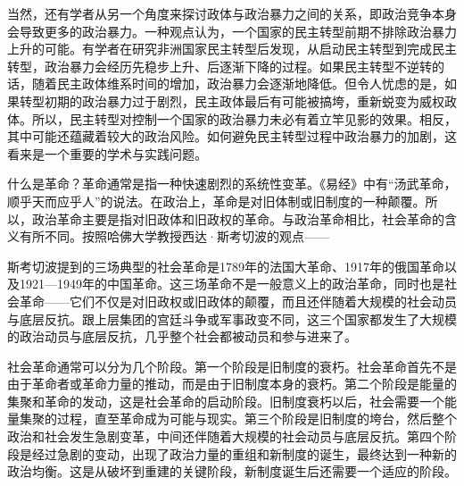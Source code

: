 当然，还有学者从另一个角度来探讨政体与政治暴力之间的关系，即政治竞争本身会导致更多的政治暴力。一种观点认为，一个国家的民主转型前期不排除政治暴力上升的可能。有学者在研究非洲国家民主转型后发现，从启动民主转型到完成民主转型，政治暴力会经历先稳步上升、后逐渐下降的过程。如果民主转型不逆转的话，随着民主政体维系时间的增加，政治暴力会逐渐地降低。但令人忧虑的是，如果转型初期的政治暴力过于剧烈，民主政体最后有可能被搞垮，重新蜕变为威权政体。所以，民主转型对控制一个国家的政治暴力未必有着立竿见影的效果。相反，其中可能还蕴藏着较大的政治风险。如何避免民主转型过程中政治暴力的加剧，这看来是一个重要的学术与实践问题。


什么是革命？革命通常是指一种快速剧烈的系统性变革。《易经》中有“汤武革命，顺乎天而应乎人”的说法。在政治上，革命是对旧体制或旧制度的一种颠覆。所以，政治革命主要是指对旧政体和旧政权的革命。与政治革命相比，社会革命的含义有所不同。按照哈佛大学教授西达·斯考切波的观点——


斯考切波提到的三场典型的社会革命是1789年的法国大革命、1917年的俄国革命以及1921—1949年的中国革命。这三场革命不是一般意义上的政治革命，同时也是社会革命——它们不仅是对旧政权或旧政体的颠覆，而且还伴随着大规模的社会动员与底层反抗。跟上层集团的宫廷斗争或军事政变不同，这三个国家都发生了大规模的政治动员与底层反抗，几乎整个社会都被动员和参与进来了。

社会革命通常可以分为几个阶段。第一个阶段是旧制度的衰朽。社会革命首先不是由于革命者或革命力量的推动，而是由于旧制度本身的衰朽。第二个阶段是能量的集聚和革命的发动，这是社会革命的启动阶段。旧制度衰朽以后，社会需要一个能量集聚的过程，直至革命成为可能与现实。第三个阶段是旧制度的垮台，然后整个政治和社会发生急剧变革，中间还伴随着大规模的社会动员与底层反抗。第四个阶段是经过急剧的变动，出现了政治力量的重组和新制度的诞生，最终达到一种新的政治均衡。这是从破坏到重建的关键阶段，新制度诞生后还需要一个适应的阶段。


